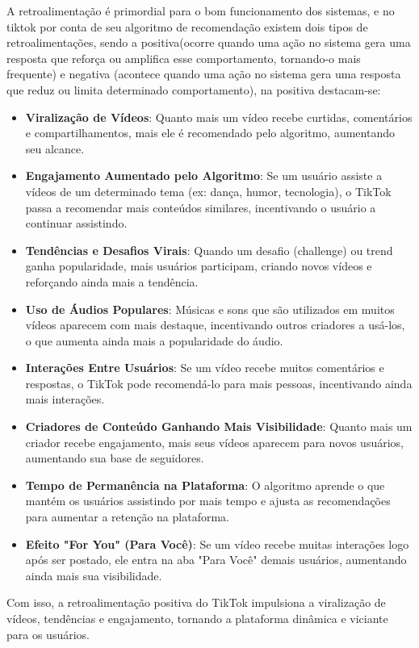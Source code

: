A  retroalimentação é primordial para o bom funcionamento dos sistemas, e no tiktok  por conta de seu algoritmo de recomendação existem dois tipos de retroalimentações, sendo a positiva(ocorre quando uma ação no sistema gera uma resposta que reforça ou amplifica esse comportamento, tornando-o mais frequente) e negativa (acontece quando uma ação no sistema gera uma resposta que reduz ou limita determinado comportamento), na positiva destacam-se:

\begin{itemize}
 \item \textbf{Viralização de Vídeos}: Quanto mais um vídeo recebe curtidas, comentários e compartilhamentos, mais ele é recomendado pelo algoritmo, aumentando seu alcance.
\item \textbf{Engajamento Aumentado pelo Algoritmo}: Se um usuário assiste a vídeos de um determinado tema (ex: dança, humor, tecnologia), o TikTok passa a recomendar mais conteúdos similares, incentivando o usuário a continuar assistindo.
\item \textbf{Tendências e Desafios Virais}: Quando um desafio (challenge) ou trend ganha popularidade, mais usuários participam, criando novos vídeos e reforçando ainda mais a tendência.
\item \textbf{Uso de Áudios Populares}: Músicas e sons que são utilizados em muitos vídeos aparecem com mais destaque, incentivando outros criadores a usá-los, o que aumenta ainda mais a popularidade do áudio.
\item \textbf{Interações Entre Usuários}: Se um vídeo recebe muitos comentários e respostas, o TikTok pode recomendá-lo para mais pessoas, incentivando ainda mais interações.
\item \textbf{Criadores de Conteúdo Ganhando Mais Visibilidade}: Quanto mais um criador recebe engajamento, mais seus vídeos aparecem para novos usuários, aumentando sua base de seguidores.
\item \textbf{Tempo de Permanência na Plataforma}:
O algoritmo aprende o que mantém os usuários assistindo por mais tempo e ajusta as recomendações para aumentar a retenção na plataforma.
\item \textbf{Efeito "For You" (Para Você)}:
Se um vídeo recebe muitas interações logo após ser postado, ele entra na aba "Para Você" demais usuários, aumentando ainda mais sua visibilidade.
\end{itemize}


Com isso, a retroalimentação positiva do TikTok impulsiona a viralização de vídeos, tendências e engajamento, tornando a plataforma dinâmica e viciante para os usuários.\vskip0.3cm

